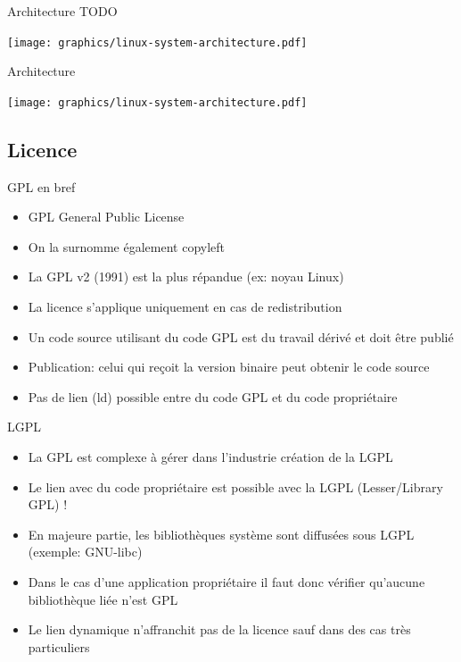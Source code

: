 \begin{frame}{Architecture TODO}{}
  \begin{center}
    \texttt{[image: graphics/linux-system-architecture.pdf]}
  \end{center}
\end{frame}

\begin{frame}{Architecture}{}
  \begin{center}
    \texttt{[image: graphics/linux-system-architecture.pdf]}
  \end{center}
\end{frame}

\subsection{Licence}

\begin{frame}{GPL en bref}{}
  \begin{itemize}
  \item GPL General Public License
  \item On la surnomme également copyleft
  \item La GPL v2 (1991) est la plus répandue (ex: noyau Linux)
  \item La licence s'applique uniquement en cas de redistribution
  \item Un code source utilisant du code GPL est du travail dérivé et doit être publié
  \item Publication: celui qui reçoit la version binaire peut obtenir le code source
  \item Pas de lien (ld) possible entre du code GPL et du code propriétaire
  \end{itemize}
\end{frame}

\begin{frame}{LGPL}{}
  \begin{itemize}
  \item La GPL est complexe à gérer dans l'industrie \MVRightarrow{} création de la LGPL
  \item Le lien avec du code propriétaire est possible avec la LGPL (Lesser/Library GPL) !
  \item En majeure partie, les bibliothèques système sont diffusées sous LGPL (exemple: GNU-libc)
  \item Dans le cas d'une application propriétaire il faut donc vérifier qu'aucune bibliothèque liée n'est GPL
  \item Le lien dynamique n'affranchit pas de la licence sauf dans des cas très particuliers
  \end{itemize}
\end{frame}

